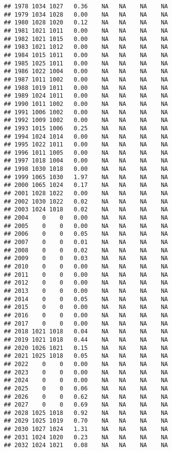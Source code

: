 \documentclass{article}\usepackage{graphicx, color}
\makeatletter
\newenvironment{kframe}{%
 \def\at@end@of@kframe{}%
 \ifinner\ifhmode%
  \def\at@end@of@kframe{\end{minipage}}%
  \begin{minipage}{\columnwidth}%
 \fi\fi%
 \def\FrameCommand##1{\hskip\@totalleftmargin \hskip-\fboxsep
 \colorbox{shadecolor}{##1}\hskip-\fboxsep
     \hskip-\linewidth \hskip-\@totalleftmargin \hskip\columnwidth}%
 \MakeFramed {\advance\hsize-\width
   \@totalleftmargin\z@ \linewidth\hsize
   \@setminipage}}%
 {\par\unskip\endMakeFramed%
 \at@end@of@kframe}
\newenvironment{knitrout}{}{} %
\makeatother
\begin{document}
\begin{knitrout}
\begin{kframe}
\begin{verbatim}
## 1978 1034 1027   0.36    NA   NA    NA    NA
## 1979 1034 1028   0.00    NA   NA    NA    NA
## 1980 1028 1020   0.12    NA   NA    NA    NA
## 1981 1021 1011   0.00    NA   NA    NA    NA
## 1982 1021 1015   0.00    NA   NA    NA    NA
## 1983 1021 1012   0.00    NA   NA    NA    NA
## 1984 1015 1011   0.00    NA   NA    NA    NA
## 1985 1025 1011   0.00    NA   NA    NA    NA
## 1986 1022 1004   0.00    NA   NA    NA    NA
## 1987 1011 1002   0.00    NA   NA    NA    NA
## 1988 1019 1011   0.00    NA   NA    NA    NA
## 1989 1024 1011   0.00    NA   NA    NA    NA
## 1990 1011 1002   0.00    NA   NA    NA    NA
## 1991 1006 1002   0.00    NA   NA    NA    NA
## 1992 1009 1002   0.00    NA   NA    NA    NA
## 1993 1015 1006   0.25    NA   NA    NA    NA
## 1994 1024 1014   0.00    NA   NA    NA    NA
## 1995 1022 1011   0.00    NA   NA    NA    NA
## 1996 1011 1005   0.00    NA   NA    NA    NA
## 1997 1018 1004   0.00    NA   NA    NA    NA
## 1998 1030 1018   0.00    NA   NA    NA    NA
## 1999 1065 1030   1.97    NA   NA    NA    NA
## 2000 1065 1024   0.17    NA   NA    NA    NA
## 2001 1028 1022   0.00    NA   NA    NA    NA
## 2002 1030 1022   0.02    NA   NA    NA    NA
## 2003 1024 1018   0.02    NA   NA    NA    NA
## 2004    0    0   0.00    NA   NA    NA    NA
## 2005    0    0   0.00    NA   NA    NA    NA
## 2006    0    0   0.05    NA   NA    NA    NA
## 2007    0    0   0.01    NA   NA    NA    NA
## 2008    0    0   0.02    NA   NA    NA    NA
## 2009    0    0   0.03    NA   NA    NA    NA
## 2010    0    0   0.00    NA   NA    NA    NA
## 2011    0    0   0.00    NA   NA    NA    NA
## 2012    0    0   0.00    NA   NA    NA    NA
## 2013    0    0   0.00    NA   NA    NA    NA
## 2014    0    0   0.05    NA   NA    NA    NA
## 2015    0    0   0.00    NA   NA    NA    NA
## 2016    0    0   0.00    NA   NA    NA    NA
## 2017    0    0   0.00    NA   NA    NA    NA
## 2018 1021 1018   0.04    NA   NA    NA    NA
## 2019 1021 1018   0.44    NA   NA    NA    NA
## 2020 1026 1021   0.15    NA   NA    NA    NA
## 2021 1025 1018   0.05    NA   NA    NA    NA
## 2022    0    0   0.00    NA   NA    NA    NA
## 2023    0    0   0.00    NA   NA    NA    NA
## 2024    0    0   0.00    NA   NA    NA    NA
## 2025    0    0   0.06    NA   NA    NA    NA
## 2026    0    0   0.62    NA   NA    NA    NA
## 2027    0    0   0.69    NA   NA    NA    NA
## 2028 1025 1018   0.92    NA   NA    NA    NA
## 2029 1025 1019   0.70    NA   NA    NA    NA
## 2030 1027 1024   1.31    NA   NA    NA    NA
## 2031 1024 1020   0.23    NA   NA    NA    NA
## 2032 1024 1021   0.08    NA   NA    NA    NA

\end{verbatim}
\end{kframe}
\end{knitrout}
\end{document}
